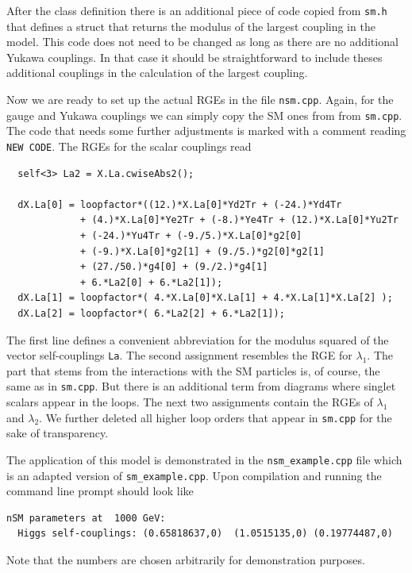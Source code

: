 \documentclass[11pt,a4paper]{article}
\begin{document}
After the class definition there is an additional piece of code copied from \texttt{sm.h} that defines a struct that returns the modulus of the largest coupling in the model. This code does not need to be changed as long as there are no additional Yukawa couplings. In that case it should be straightforward to include theses additional couplings in the calculation of the largest coupling.

Now we are ready to set up the actual RGEs in the file \texttt{nsm.cpp}. Again, for the gauge and Yukawa couplings we can simply copy the SM ones from from \texttt{sm.cpp}. The code that needs some further adjustments is marked with a comment reading \texttt{NEW CODE}. The RGEs for the scalar couplings read
\begin{lstlisting}
  self<3> La2 = X.La.cwiseAbs2();

  dX.La[0] = loopfactor*((12.)*X.La[0]*Yd2Tr + (-24.)*Yd4Tr
             + (4.)*X.La[0]*Ye2Tr + (-8.)*Ye4Tr + (12.)*X.La[0]*Yu2Tr
             + (-24.)*Yu4Tr + (-9./5.)*X.La[0]*g2[0]
             + (-9.)*X.La[0]*g2[1] + (9./5.)*g2[0]*g2[1]
             + (27./50.)*g4[0] + (9./2.)*g4[1]
             + 6.*La2[0] + 6.*La2[1]);
  dX.La[1] = loopfactor*( 4.*X.La[0]*X.La[1] + 4.*X.La[1]*X.La[2] );
  dX.La[2] = loopfactor*( 6.*La2[2] + 6.*La2[1]);
\end{lstlisting}
The first line defines a convenient abbreviation for the modulus squared of the vector self-couplings \texttt{La}. The second assignment resembles the RGE for $\lambda_1$. The part that stems from the interactions with the SM particles is, of course, the same as in \texttt{sm.cpp}. But there is an additional term from diagrams where singlet scalars appear in the loops. The next two assignments contain the RGEs of $\lambda_1$ and $\lambda_2$. We further deleted all higher loop orders that appear in \texttt{sm.cpp} for the sake of transparency.

The application of this model is demonstrated in the \texttt{nsm\_example.cpp} file which is an adapted version of \texttt{sm\_example.cpp}. Upon compilation and running the command line prompt should look like
\begin{lstlisting}[keywordstyle=\color{blue}]
  nSM parameters at  1000 GeV:
  Higgs self-couplings: (0.65818637,0)  (1.0515135,0) (0.19774487,0)
\end{lstlisting}
Note that the numbers are chosen arbitrarily for demonstration purposes.
\end{document}
